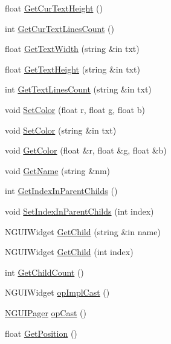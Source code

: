 \begin{DoxyCompactItemize}
\item 
float \hyperlink{class_n_g_u_i_pager_a53e4fd8b6b4d2496e0e852ec226161da}{Get\+Cur\+Text\+Height} ()
\item 
int \hyperlink{class_n_g_u_i_pager_a29fc7abb5cab04f2ef657b27785122f7}{Get\+Cur\+Text\+Lines\+Count} ()
\item 
float \hyperlink{class_n_g_u_i_pager_a74d6a7719b103fef8e0991bc8d2fe75f}{Get\+Text\+Width} (string \&in txt)
\item 
float \hyperlink{class_n_g_u_i_pager_a485c63ded86931a1355ab6985d0ee100}{Get\+Text\+Height} (string \&in txt)
\item 
int \hyperlink{class_n_g_u_i_pager_a0a278daabd4077ab0579ea0a8b64ef53}{Get\+Text\+Lines\+Count} (string \&in txt)
\item 
void \hyperlink{class_n_g_u_i_pager_a56c05b82ab3a5a5bff1aaad16218b814}{Set\+Color} (float r, float g, float b)
\item 
void \hyperlink{class_n_g_u_i_pager_a943b1793c7f7539d6607dd61c3df3337}{Set\+Color} (string \&in txt)
\item 
void \hyperlink{class_n_g_u_i_pager_a46974513026e47b98472244040a14d68}{Get\+Color} (float \&r, float \&g, float \&b)
\item 
void \hyperlink{class_n_g_u_i_pager_a668a6f588b13193f5155e74db2c4188d}{Get\+Name} (string \&nm)
\item 
int \hyperlink{class_n_g_u_i_pager_a69dfcdc43fe85404a9c4417dc47342ed}{Get\+Index\+In\+Parent\+Childs} ()
\item 
void \hyperlink{class_n_g_u_i_pager_a8d08d8f767486ec0a5f9ab402c1a97bc}{Set\+Index\+In\+Parent\+Childs} (int index)
\item 
N\+G\+U\+I\+Widget \hyperlink{class_n_g_u_i_pager_a67178e57e17c986770a5058407cfe3ae}{Get\+Child} (string \&in name)
\item 
N\+G\+U\+I\+Widget \hyperlink{class_n_g_u_i_pager_a159a10e41748b5100b3f221fe89a859a}{Get\+Child} (int index)
\item 
int \hyperlink{class_n_g_u_i_pager_a0cd9357fbe6d7d0a378da540f89933ac}{Get\+Child\+Count} ()
\item 
N\+G\+U\+I\+Widget \hyperlink{class_n_g_u_i_pager_acf4f6f0b723eea350bc49cf5df6b5353}{op\+Impl\+Cast} ()
\item 
\hyperlink{class_n_g_u_i_pager}{N\+G\+U\+I\+Pager} \hyperlink{class_n_g_u_i_pager_a3e2a9ea2f57516414e8f1c2da5017c37}{op\+Cast} ()
\item 
float \hyperlink{class_n_g_u_i_pager_af03ec0de7e7004c1133fdaaf0b08cff9}{Get\+Position} ()

\end{DoxyCompactItemize}
